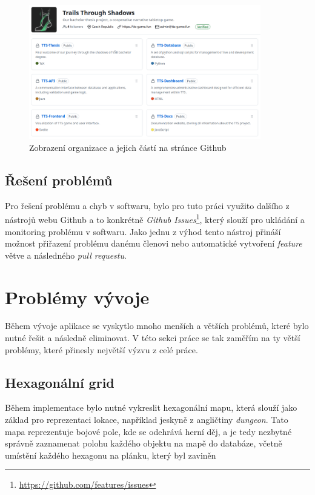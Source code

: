 \begin{figure}[H]
    \centering
    \includegraphics[width=0.9\textwidth]{../../shared/figures/gitOrg}
    \caption{Zobrazení organizace a jejich částí na stránce Github}
    \label{fig:git_organization}
\end{figure}

\subsection{Řešení problémů}
\label{subsec:implementation-collaboration-problems}
Pro řešení problému a chyb v softwaru, bylo pro tuto práci využito dalšího z nástrojů webu Github a to konkrétně \textit{Github Issues}\footnote{\href{https://github.com/features/issues}{https://github.com/features/issues}}, který slouží pro ukládání a monitoring problému v softwaru. Jako jednu z výhod tento nástroj přináší možnost přiřazení problému danému členovi nebo automatické vytvoření \textit{feature} větve a následného \textit{pull requestu}.

\section{Problémy vývoje}
\label{sec:implementation-problems}
Během vývoje aplikace se vyskytlo mnoho menších a větších problémů, které bylo nutné řešit a následně eliminovat. V této sekci práce se tak zaměřím na ty větší problémy, které přinesly největší výzvu z celé práce.

\subsection*{Hexagonální grid}
\label{subsec:implementation-problems-hexagon}
Během implementace bylo nutné vykreslit hexagonální mapu, která slouží jako základ pro reprezentaci lokace, například jeskyně z angličtiny \textit{dungeon}. Tato mapa reprezentuje bojové pole, kde se odehrává herní děj, a je tedy nezbytné správně zaznamenat polohu každého objektu na mapě do databáze, včetně umístění každého hexagonu na plánku, který byl zaviněn

